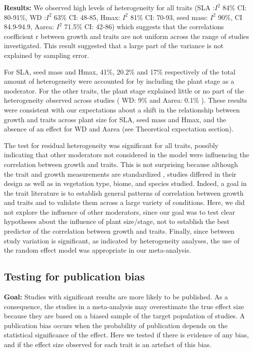\noindent\textbf{Results:} We observed high levels of heterogeneity for all traits (SLA :$I^{2}$ 84\% CI: 80-91\%, WD :$I^{2}$ 63\% CI: 48-85, Hmax: $I^{2}$ 81\% CI: 70-93, seed mass: $I^{2}$ 90\%, CI 84.9-94.9, Aarea: $I^{2}$ 71.5\% CI: 42-86) which suggests that the correlations coefficient r between growth and traits are not uniform across the range of studies investigated. This result suggested that a large part of the variance is not explained by sampling error.

For SLA, seed mass and Hmax, 41\%, 20.2\% and 17\% respectively of the total amount of heterogeneity were accounted for by including the plant stage as a moderator. For the other traits, the plant stage explained little or no part of the heterogeneity observed across studies ( WD: 9\% and Aarea: 0.1\% ). These results were consistent with our expectations about a shift in the relationship between growth and traits across plant size for SLA, seed mass and Hmax, and the absence of an effect for WD and Aarea (see Theoretical expectation section). 

The test for residual heterogeneity was significant for all traits, possibly indicating that other moderators not considered in the model were influencing the correlation between growth and traits. This is not surprising because although the trait and growth measurements are standardized \citep{Cornelissen:2003gw}, studies differed in their design as well as in vegetation type, biome, and species studied. Indeed, a goal in the trait literature is to establish general patterns of correlation between growth and traits and to validate them across a large variety of conditions. Here, we did not explore the influence of other moderators, since our goal was to test clear hypotheses about the influence of plant size/stage, not to establish the best predictor of the correlation between growth and traits. Finally, since between study variation is significant, as indicated by heterogeneity analyses, the use of the random effect model was appropriate in our meta-analysis.

\subsection{Testing for publication bias}
\noindent\textbf{Goal:} Studies with significant results are more likely to be published. As a consequence, the studies in a meta-analysis may overestimate the true effect size because they are based on a biased sample of the target population of studies. A publication bias occurs when the probability of publication depends on the statistical significance of the effect. Here we tested if there is evidence of any bias, and if the effect size observed for each trait is an artefact of this bias.

